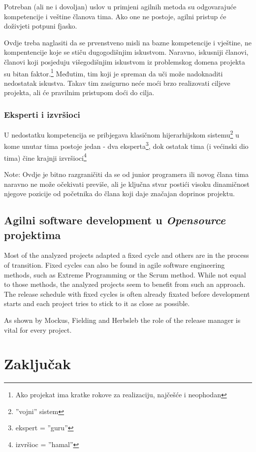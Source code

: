 \documentclass[lmodern, utf8, zavrsni]{fit}
\begin{document}
Potreban (ali ne i dovoljan) uslov u primjeni agilnih metoda su odgovarajuće kompetencije i veštine članova tima. Ako one ne postoje, agilni pristup će doživjeti potpuni fjasko.

Ovdje treba naglasiti da se prvenstveno misli na bazne kompetencije i vještine, ne kompentencije koje se stiču dugogodišnjim iskustvom. Naravno, iskusniji članovi, članovi koji posjeduju višegodišnjim iskustvom iz problemskog domena projekta su bitan faktor.\footnote{Ako projekat ima kratke rokove za realizaciju, najčešće i neophodan} Međutim, tim koji je spreman da uči može nadoknaditi nedostatak iskustva. Takav tim zasigurno neće moći brzo realizovati ciljeve projekta, ali će pravilnim pristupom doći do cilja.

\subsection{Eksperti i izvršioci}

U nedostatku kompetencija se pribjegava klasičnom hijerarhijskom sistemu\footnote{''vojni'' sistem} u kome unutar tima postoje jedan - dva eksperta\footnote{ekspert = ''guru''}, dok ostatak tima (i većinski dio tima) čine krajnji izvršioci\footnote{izvršioc = ''hamal''}

Note: Ovdje je bitno razgraničiti da se od junior programera ili novog člana tima naravno ne može očekivati previše, ali je ključna stvar postići visoku dinamičnost njegove pozicije od početnika do člana koji daje značajan doprinos projektu.


\section{Agilni software development u \emph{Opensource} projektima}

Most of the analyzed projects adapted a fixed cycle and others are in the process of transition. Fixed cycles can also be found in agile software engineering methods, such as Extreme Programming or the Scrum method. While not equal to those methods, the analyzed projects seem to benefit from such an approach. The release schedule with fixed cycles is often already fixated before development starts and each project tries to stick to it as close as possible.\citep[str. 95]{Siegel2012}

As shown by Mockus, Fielding and Herbsleb the role of the release manager is vital for every project.\citep[str. 95]{Siegel2012}

\chapter{Zaključak}
\end{document}

